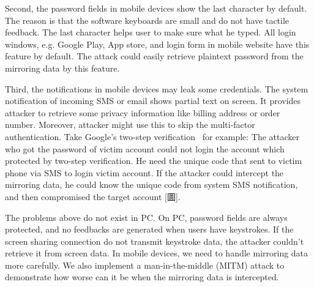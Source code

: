 Second, the password fields in mobile devices show the last character by default. The reason is that the software keyboards are small and do not have tactile feedback. The last character helps user to make sure what he typed. All login windows, e.g. Google Play, App store, and login form in mobile website have this feature by default. The attack could easily retrieve plaintext password from the mirroring data by this feature.

Third, the notifications in mobile devices may leak some credentials. The system notification of incoming SMS or email shows partial text on screen. It provides attacker to retrieve some privacy information like billing address or order number. Moreover, attacker might use this to skip the multi-factor authentication. Take Google's two-step verification~\cite{GoogleTwoStep} for example: The attacker who got the password of victim account could not login the account which protected by two-step verification. He need the unique code that sent to victim phone via SMS to login victim account. If the attacker could intercept the mirroring data, he could know the unique code from system SMS notification, and then compromised the target account [圖].

The problems above do not exist in PC. On PC, password fields are always protected, and no feedbacks are generated when users have keystrokes. If the screen sharing connection do not transmit keystroke data, the attacker couldn't retrieve it from screen data. In mobile devices, we need to handle mirroring data more carefully. We also implement a man-in-the-middle (MITM) attack to demonstrate how worse can it be when the mirroring data is intercepted.
